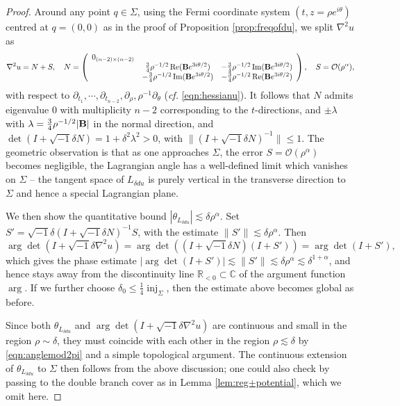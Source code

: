 \documentclass[11pt,a4paper]{article}
\numberwithin{equation}{section}%
\theoremstyle{definition}
\newcommand{\cf}{\emph{cf.} }
\newcommand{\R}{\mathbb{R}}
\newcommand{\C}{\mathbb{C}}
\begin{document}
\begin{proof}
Around any point $q\in \Sigma$, using the Fermi coordinate system $(t,z=\rho e^{i\theta})$ centred at $q=(0,0)$ as in the proof of Proposition \ref{prop:freqofdu}, we split $\nabla^2u$ as 
\begin{equation}
\label{eqn:Hessunearbranch}
    \nabla^2u=N+S,\quad N=\left(\begin{array}{ccc}
    0_{(n-2)\times (n-2)}& &\\ &\frac{3}{4}\rho^{-1/2}\operatorname{Re}({\bf{B}}e^{3i\theta/2}) & -\frac{3}{4}\rho^{-1/2}\operatorname{Im}({\bf{B}}e^{3i\theta/2}) \\
    &-\frac{3}{4}\rho^{-1/2}\operatorname{Im}({\bf{B}}e^{3i\theta/2}) & -\frac{3}{4}\rho^{-1/2}\operatorname{Re}({\bf{B}}e^{3i\theta/2})
\end{array}\right),\quad S=\mathcal{O}(\rho^\alpha),
\end{equation}
with respect to $\partial_{t_1},\cdots,\partial_{t_{n-2}},\partial_\rho,\rho^{-1}\partial_\theta$ (\cf \eqref{eqn:hessianu}). It follows that $N$ admits eigenvalue $0$ with multiplicity $n-2$ corresponding to the $t$-directions, and $\pm \lambda$ with $\lambda=\frac{3}{4}\rho^{-1/2}|\bf{B}|$ in the normal direction, and $\det(I+\sqrt{-1}\delta N)=1+\delta^2\lambda^2>0$, with $\|(I+\sqrt{-1}\delta N)^{-1}\|\leqslant 1$. The geometric observation is that as one approaches $\Sigma$, the error $S=\mathcal{O}(\rho^\alpha)$ becomes negligible, the Lagrangian angle has a well-defined limit which vanishes on $\Sigma$ -- the tangent space of $L_{\delta du}$ is purely vertical in the transverse direction to $\Sigma$ and hence a special Lagrangian plane. 

We then show the quantitative bound $|\theta_{L_{\delta du}}|\lesssim \delta \rho^\alpha$. Set $S'=\sqrt{-1}\delta(I+\sqrt{-1}\delta N)^{-1}S$, with the estimate $\|S'\|\lesssim \delta\rho^{\alpha}$. Then
$$\arg\det(I+\sqrt{-1}\delta\nabla^2 u)=\arg\det\left((I+\sqrt{-1}\delta N)(I+S')\right)=\arg\det (I+S'),$$
which gives the phase estimate $|\arg \det (I+S')|\lesssim \|S'\|\lesssim\delta \rho^\alpha\lesssim \delta^{1+\alpha}$, and hence stays away from the discontinuity line $\R_{<0}\subset \C$ of the argument function $\arg$. If we further choose $\delta_0\leqslant \frac{1}{4}\operatorname{inj}_\Sigma$, then the estimate above becomes global as before. 

Since both $\theta_{L_{\delta du}}$ and $\arg\det (I+\sqrt{-1}\delta\nabla^2 u)$ are continuous and small in the region $\rho \sim \delta$, they must coincide with each other in the region $\rho \lesssim \delta$ by \eqref{eqn:anglemod2pi} and a simple topological argument. The continuous extension of $\theta_{L_{\delta du}}$ to $\Sigma$ then follows from the above discussion; one could also check by passing to the double branch cover as in Lemma \ref{lem:reg+potential}, which we omit here.
\end{proof}
\end{document}
